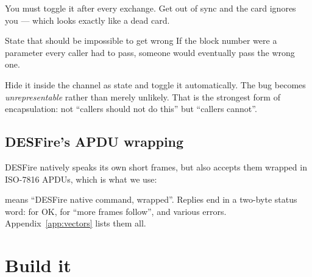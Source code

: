You must toggle it after every exchange. Get out of sync and the card ignores
you --- which looks exactly like a dead card.

\begin{concept}{State that should be impossible to get wrong}
If the block number were a parameter every caller had to pass, someone would
eventually pass the wrong one.

Hide it inside the channel as  state and toggle it automatically.
The bug becomes \emph{unrepresentable} rather than merely unlikely. That is the
strongest form of encapsulation: not ``callers should not do this'' but
``callers cannot''.
\end{concept}

\subsection{DESFire's APDU wrapping}

DESFire natively speaks its own short frames, but also accepts them wrapped in
ISO-7816 APDUs, which is what we use:

\begin{center}
\end{center}

 means ``DESFire native command, wrapped''. Replies end in a two-byte
status word:  for OK,  for ``more frames follow'', and
various  errors. Appendix~\ref{app:vectors} lists them all.

\section{Build it}

